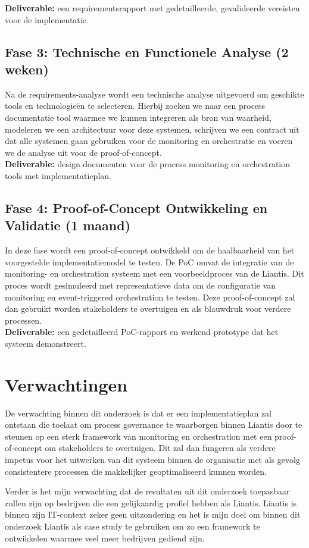\textbf{Deliverable:} een requirementsrapport met gedetailleerde, gevalideerde vereisten voor de implementatie.

\subsection{Fase 3: Technische en Functionele Analyse (2 weken)}

Na de requirements-analyse wordt een technische analyse uitgevoerd om geschikte tools en technologieën te selecteren. Hierbij zoeken we naar een process documentatie tool waarmee we kunnen integreren als bron van waarheid, modeleren we een architectuur voor deze systemen, schrijven we een contract uit dat alle systemen gaan gebruiken voor de monitoring en orchestratie en voeren we de analyse uit voor de proof-of-concept.  \\

\textbf{Deliverable:} design documenten voor de process monitoring en orchestration tools met implementatieplan.

\subsection{Fase 4: Proof-of-Concept Ontwikkeling en Validatie (1 maand)}

In deze fase wordt een proof-of-concept ontwikkeld om de haalbaarheid van het voorgestelde implementatiemodel te testen. De PoC omvat de integratie van de monitoring- en orchestration systeem met een voorbeeldproces van de Liantis. Dit proces wordt gesimuleerd met representatieve data om de configuratie van monitoring en event-triggered orchestration te testen. Deze proof-of-concept zal dan gebruikt worden stakeholders te overtuigen en als blauwdruk voor verdere processen. \\

\textbf{Deliverable:} een gedetailleerd PoC-rapport en werkend prototype dat het systeem demonstreert.

\section{Verwachtingen}%
\label{sec:verwachtingen}
De verwachting binnen dit onderzoek is dat er een implementatieplan zal ontstaan die toelaat om process governance te waarborgen binnen Liantis door te steunen op een sterk framework van monitoring en orchestration met een proof-of-concept om stakeholders te overtuigen. Dit zal dan fungeren als verdere impetus voor het uitwerken van dit systeem binnen de organisatie met als gevolg consistentere processen die makkelijker geoptimaliseerd kunnen worden.

Verder is het mijn verwachting dat de resultaten uit dit onderzoek toepasbaar zullen zijn op bedrijven die een gelijkaardig profiel hebben als Liantis. Liantis is binnen zijn IT-context zeker geen uitzondering en het is mijn doel om binnen dit onderzoek Liantis als case study te gebruiken om zo een framework te ontwikkelen waarmee veel meer bedrijven gediend zijn.

